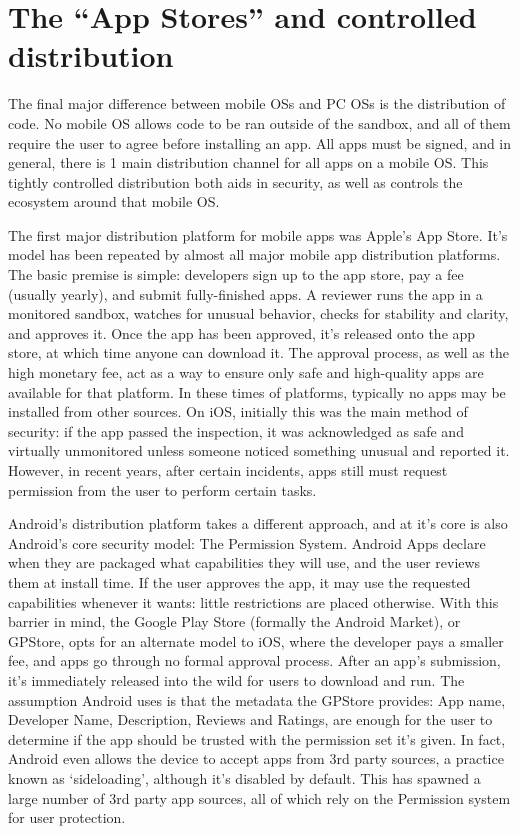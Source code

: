 
\section{The ``App Stores'' and controlled distribution}

The final major difference between mobile OSs and PC OSs is the distribution of code. No mobile OS allows code to be ran outside of the sandbox, and all of them require the user to agree before installing an app. All apps must be signed, and in general, there is 1 main distribution channel for all apps on a mobile OS. This tightly controlled distribution both aids in security, as well as controls the ecosystem around that mobile OS.

The first major distribution platform for mobile apps was Apple’s App Store\citep{AppleAppStore}. It’s model has been repeated by almost all major mobile app distribution platforms. The basic premise is simple: developers sign up to the app store, pay a fee (usually yearly), and submit fully-finished apps. A reviewer runs the app in a monitored sandbox, watches for unusual behavior, checks for stability and clarity, and approves it. Once the app has been approved, it’s released onto the app store, at which time anyone can download it. The approval process, as well as the high monetary fee, act as a way to ensure only safe and high-quality apps are available for that platform. In these times of platforms, typically no apps may be installed from other sources. On iOS, initially this was the main method of security: if the app passed the inspection, it was acknowledged as safe and virtually unmonitored unless someone noticed something unusual and reported it. However, in recent years, after certain incidents, apps still must request permission from the user to perform certain tasks.

Android’s distribution platform takes a different approach, and at it’s core is also Android’s core security model: The Permission System. Android Apps declare when they are packaged what capabilities they will use, and the user reviews them at install time. If the user approves the app, it may use the requested capabilities whenever it wants: little restrictions are placed otherwise. With this barrier in mind, the Google Play Store (formally the Android Market), or GPStore, opts for an alternate model to iOS, where the developer pays a smaller fee, and apps go through no formal approval process. After an app’s submission, it’s immediately released into the wild for users to download and run. The assumption Android uses is that the metadata the GPStore provides: App name, Developer Name, Description, Reviews and Ratings, are enough for the user to determine if the app should be trusted with the permission set it’s given. In fact, Android even allows the device to accept apps from 3rd party sources, a practice known as ‘sideloading’, although it’s disabled by default. This has spawned a large number of 3rd party app sources, all of which rely on the Permission system for user protection.

